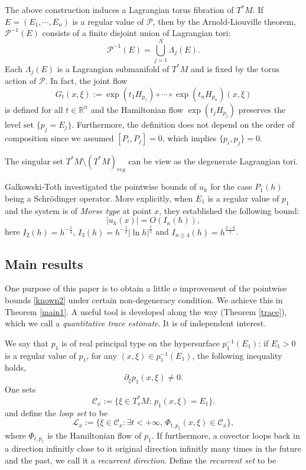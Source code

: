 \documentclass[12pt,reqno]{amsart}
\newcommand{\R}{{\mathbb R}}
\numberwithin{equation}{section}
\begin{document}
The above construction induces a Lagrangian torus fibration of $T^*M$. If $E=(E_1,\cdots,E_n)$ is a regular value of $\mathcal{P}$, then by the Arnold-Liouville theorem, $\mathcal{P}^{-1}(E)$ consists of a finite disjoint union of Lagrangian tori:
$$
\mathcal{P}^{-1}(E)=\bigcup_{j=1}^N \Lambda_j(E).
$$
Each $\Lambda_j(E)$ is a Lagrangian submanifold of $T^*M$ and is fixed by the torus action of $\mathcal{P}$. In fact, the joint flow 
$$
G_{t}(x,\xi):=\exp (t_1H_{p_1})\circ \cdots\circ\exp(t_nH_{p_n})(x,\xi)
$$
is defined for all $t\in \R^n$ and the Hamiltonian flow $\exp (t_jH_{p_j})$ preserves the level set $\{p_j=E_j\}$. Furthermore, the definition does not depend on the order of composition since we assumed $[P_i,P_j]=0$, which implies $\{p_i,p_j\}=0$.

The singular set $T^*M\setminus(T^*M)_{reg}$ can be view as the degenerate Lagrangian tori.

Galkowski-Toth \cite{GT2020} investigated the pointwise bounds of $u_h$ for the case $P_1(h)$ being a Schr\"odinger operator. More explicitly, when $E_1$ is a regular value of $p_1$ and the system is of {\em Morse type} at point $x$, they established the following bound:
\begin{equation}\label{known2}
|u_h(x)|=O(I_n(h)),
\end{equation}
here $I_2(h)=h^{-\frac{1}4}$, $I_3(h)=h^{-\frac{1}2}|\ln h|^{\frac{1}2}$ and $I_{n\geq 4}(h)=h^{\frac{2-n}2}$.

\subsection{Main results}
One purpose of this paper is to obtain a little $o$ improvement of the pointwise bounds \eqref{known2} under certain non-degeneracy condition. We achieve this in Theorem \ref{main1}. A useful tool is developed along the way (Theorem \ref{trace}), which we call a {\textit{quantitative trace estimate}}. It is of independent interest. 

We say that $p_1$ is of real principal type on the hypersurface $p_1^{-1}(E_1)$: if $E_1>0$ is a regular value of $p_1$, for any $(x,\xi)\in p_1^{-1}(E_1)$, the following inequality holds,
\begin{equation}\label{principal}
\partial_\xi p_1(x,\xi)\neq 0.
\end{equation}
One sets
\begin{equation}\label{loop set}
\mathcal{C}_x:=\{\xi\in T_x^*M:\, p_1(x,\xi)=E_1\}.
\end{equation} 
and define the {\textit{loop set}} to be
\begin{equation}
    \mathcal{L}_x:=\{\xi\in \mathcal{C}_x:\exists t<+\infty,\, \Phi_{t,p_1}(x,\xi)\in \mathcal{C}_x\},
\end{equation}
where $\Phi_{t,p_1}$ is the Hamiltonian flow of $p_1$. If furthermore, a covector loops back in a direction infinitly close to it original direction infinitly many times in the future and the past, we call it a \textit{recurrent direction}. Define the \textit{recurrent set} to be
\end{document}
